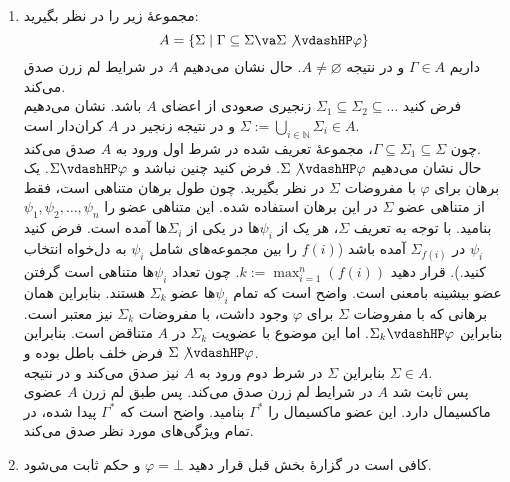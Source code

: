 \begin{ans}
    \begin{enumerate}[label=(\alph*)]
        \item
        مجموعهٔ زیر را در نظر بگیرید:
        $$A = \{\Sigma \mid \Gamma \subseteq \Sigma \va \Sigma \not\vdashHP \varphi\}$$
        داریم $\Gamma \in A$ و در نتیجه $A \neq \varnothing$. حال نشان می‌دهیم $A$ در شرایط لم زرن صدق می‌کند.\\
        فرض کنید $\Sigma_1 \subseteq \Sigma_2 \subseteq \dots$ زنجیری صعودی از اعضای $A$ باشد. نشان می‌دهیم ${\Sigma := \bigcup_{i\in\mathbb{N}} \Sigma_i \in A}$ و در نتیجه زنجیر در $A$ کران‌دار است.\\
        چون $\Gamma \subseteq \Sigma_1 \subseteq \Sigma$، مجموعهٔ تعریف شده در شرط اول ورود به $A$ صدق می‌کند.\\
        حال نشان می‌دهیم $\Sigma \not\vdashHP \varphi$. فرض کنید چنین نباشد و $\Sigma \vdashHP \varphi$. یک برهان برای $\varphi$ با مفروضات $\Sigma$ در نظر بگیرید. چون طول برهان متناهی است، فقط از متناهی عضو $\Sigma$ در این برهان استفاده شده. این متناهی عضو را $\psi_1, \psi_2, \dots, \psi_n$ بنامید. با توجه به تعریف $\Sigma$، هر یک از $\psi_i$ها در یکی از $\Sigma_i$ها آمده است. فرض کنید $\psi_i$ در $\Sigma_{f(i)}$ آمده باشد ($f(i)$ را بین مجموعه‌های شامل $\psi_i$ به دل‌خواه انتخاب کنید.). قرار دهید $k := \max_{i=1}^n(f(i))$. چون تعداد $\psi_i$ها متناهی است گرفتن عضو بیشینه بامعنی است. واضح است که تمام $\psi_i$ها عضو $\Sigma_k$ هستند. بنابراین همان برهانی که با مفروضات $\Sigma$ برای $\varphi$ وجود داشت، با مفروضات $\Sigma_k$ نیز معتبر است. بنابراین $\Sigma_k \vdashHP \varphi$. اما این موضوع با عضویت $\Sigma_k$ در $A$ متناقض است. بنابراین فرض خلف باطل بوده و $\Sigma \not\vdashHP \varphi$.\\
        بنابراین $\Sigma$ در شرط دوم ورود به $A$ نیز صدق می‌کند و در نتیجه $\Sigma \in A$.\\
        پس ثابت شد $A$ در شرایط لم زرن صدق می‌کند. پس طبق لم زرن $A$ عضوی ماکسیمال دارد. این عضو ماکسیمال را $\Gamma^*$ بنامید. واضح است که $\Gamma^*$ پیدا شده، در تمام ویژگی‌های مورد نظر صدق می‌کند.

        \item
        کافی است در گزارهٔ بخش قبل قرار دهید $\varphi = \bot$ و حکم ثابت می‌شود.


\end{enumerate}
\end{ans}
